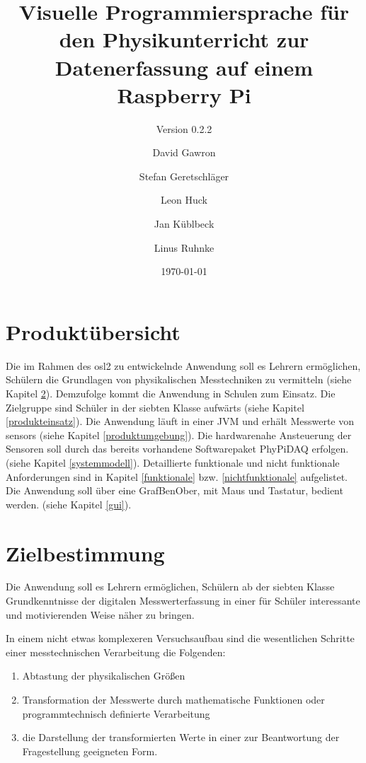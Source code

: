 \documentclass[parskip=full]{scrartcl}
\title{Visuelle Programmiersprache für den Physikunterricht zur Datenerfassung auf einem Raspberry Pi}
\subtitle{Version 0.2.2}
\author{David Gawron \and Stefan Geretschläger \and Leon Huck \and Jan Küblbeck \and Linus Ruhnke}
\date{\today}
\begin{document}
\maketitle

\newpage
\tableofcontents 					%
\newpage

\section{Produktübersicht} %

Die im Rahmen des \gls{osl2} zu entwickelnde Anwendung soll es Lehrern ermöglichen, Schülern die Grundlagen von physikalischen Messtechniken zu vermitteln (siehe Kapitel \ref{zielbestimmung}).
Demzufolge kommt die Anwendung in Schulen zum Einsatz. 
Die Zielgruppe sind Schüler in der siebten Klasse aufwärts (siehe Kapitel \ref{produkteinsatz}).
Die Anwendung läuft in einer \gls{JVM} und erhält Messwerte von \glspl{sensor} (siehe Kapitel \ref{produktumgebung}). 
Die hardwarenahe Ansteuerung der Sensoren soll durch das bereits vorhandene Softwarepaket \gls{PhyPiDAQ} erfolgen. (siehe Kapitel \ref{systemmodell}).
Detaillierte funktionale und nicht funktionale Anforderungen sind in Kapitel \ref{funktionale} bzw. \ref{nichtfunktionale} aufgelistet.
Die Anwendung soll über eine \gls{GrafBenOber}, mit Maus und Tastatur, bedient werden. (siehe Kapitel \ref{gui}).

\section{Zielbestimmung}\label{zielbestimmung}

Die Anwendung soll es Lehrern ermöglichen, Schülern ab der siebten Klasse Grundkenntnisse der digitalen Messwerterfassung in einer für Schüler interessante und motivierenden Weise näher zu bringen. 

In einem nicht etwas komplexeren Versuchsaufbau sind die wesentlichen Schritte einer messtechnischen Verarbeitung die Folgenden: 

\begin{enumerate}
	\item Abtastung der physikalischen Größen
	
	\item Transformation der Messwerte durch mathematische Funktionen oder programmtechnisch definierte Verarbeitung
	
	\item die Darstellung der transformierten Werte in einer zur Beantwortung der Fragestellung geeigneten Form.
	
\end{enumerate}
\end{document}
